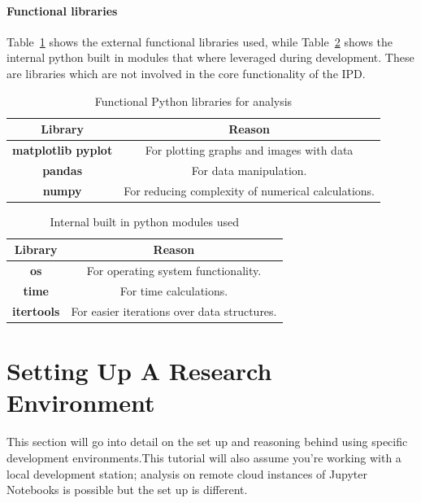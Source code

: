 \paragraph{Functional libraries}
Table~\ref{table:functionalLibrares} shows the external functional libraries used, while Table~\ref{table:builtinmodules} shows the internal python built in modules that where leveraged during development.
These are libraries which are not involved in the core functionality of the IPD\@.
\begin{table}[ht]
    \centering
    \begin{tabular}{cc}
        \toprule
        Library & Reason\\
        \midrule
        \textbf{matplotlib pyplot} & For plotting graphs and images with data\\
        \textbf{pandas} & For data manipulation.\\
        \textbf{numpy} & For reducing complexity of numerical calculations.\\
        \bottomrule
    \end{tabular}
    \caption{Functional Python libraries for analysis}\label{table:functionalLibrares}
\end{table}
\begin{table}[ht]
    \centering
    \begin{tabular}{cc}
        \toprule
        Library & Reason\\
        \midrule
        \textbf{os} & For operating system functionality.\\
        \textbf{time} & For time calculations.\\
        \textbf{itertools} & For easier iterations over data structures.\\
        \bottomrule
    \end{tabular}
    \caption{Internal built in python modules used}\label{table:builtinmodules}
\end{table}

\section{Setting Up A Research Environment}\label{subsec:settingUpAResearchEnvironment}
This section will go into detail on the set up and reasoning behind using specific development environments.This tutorial will also assume you're working with a local development station;
analysis on remote cloud instances of Jupyter Notebooks is possible but the set up is different.

